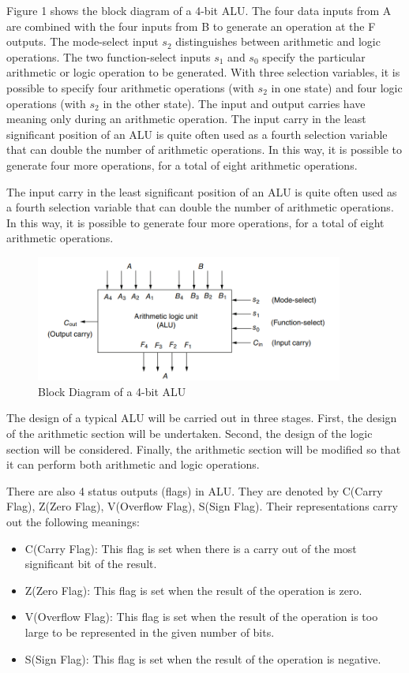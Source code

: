 \documentclass[11pt]{article}
\begin{document}
Figure 1 shows the block diagram of a 4-bit ALU. The four data inputs from A are combined with the four inputs from B to generate an operation at the F outputs. The mode-select 
input $s_2$ distinguishes between arithmetic and logic operations. The two function-select inputs $s_1$
and $s_0$ specify the particular arithmetic or logic operation to be generated. With three selection 
variables, it is possible to specify four arithmetic operations (with $s_2$ in one state) and four logic 
operations (with $s_2$ in the other state). The input and output carries have meaning only during an 
arithmetic operation.
The input carry in the least significant position of an ALU is quite often used as a fourth 
selection variable that can double the number of arithmetic operations. In this way, it is possible 
to generate four more operations, for a total of eight arithmetic operations.

The input carry in the least significant position of an ALU is quite often used as a fourth 
selection variable that can double the number of arithmetic operations. In this way, it is possible 
to generate four more operations, for a total of eight arithmetic operations.

\begin{figure}[ht]
\centering
\includegraphics[width=0.9\textwidth]{images/ALU.png}
\caption{Block Diagram of a 4-bit ALU}
\end{figure}

The design of a typical ALU will be carried out in three stages. First, the design of the 
arithmetic section will be undertaken. Second, the design of the logic section will be considered. 
Finally, the arithmetic section will be modified so that it can perform both arithmetic and logic 
operations.

There are also 4 status outputs (flags) in ALU. They are denoted by C(Carry
Flag), Z(Zero Flag), V(Overflow Flag), S(Sign Flag). Their representations carry out the
following meanings:
\begin{itemize}
    \item C(Carry Flag): This flag is set when there is a carry out of the most significant bit of the result.
    \item Z(Zero Flag): This flag is set when the result of the operation is zero.
    \item V(Overflow Flag): This flag is set when the result of the operation is too large to be represented in the given number of bits.
    \item S(Sign Flag): This flag is set when the result of the operation is negative.
\end{itemize}
\end{document}
